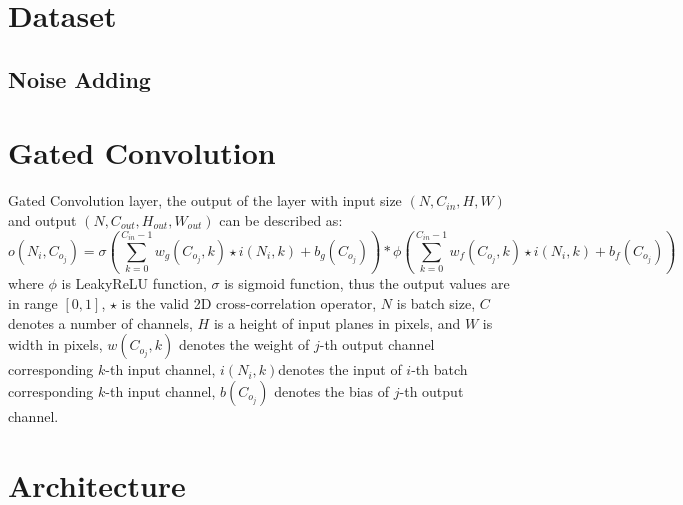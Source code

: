 \section{Dataset}




\subsection{Noise Adding}






\section{Gated Convolution}

Gated Convolution layer\cite{gconv}, the output of the layer with input size $ (N, C_{in}, H, W) $ and output $ (N, C_{out}, H_{out}, W_{out}) $ can be described as:
\begin{equation}\label{gconv}
	o(N_i, C_{o_j}) = \sigma(\sum_{k=0}^{C_{in}-1}w_g(C_{o_j}, k) \star i(N_i,k) + b_g(C_{o_j})) * 
	\phi (\sum_{k=0}^{C_{in}-1}w_f(C_{o_j}, k) \star i(N_i,k) + b_f(C_{o_j}))
\end{equation}
where $ \phi $ is LeakyReLU function, $ \sigma $ is sigmoid function, thus the output values are in range $ [0,1] $, $ \star $ is the valid 2D cross-correlation operator, $ N $ is batch size, $ C $ denotes a number of channels, $ H $ is a height of input planes in pixels, and $ W $ is width in pixels, $ w(C_{o_j},k) $ denotes the weight of $ j $-th output channel corresponding $ k $-th input channel, $ i(N_i, k) $denotes the input of $ i $-th batch corresponding $ k $-th input channel, $ b(C_{o_j}) $ denotes the bias of $ j $-th output channel.




\section{Architecture}

